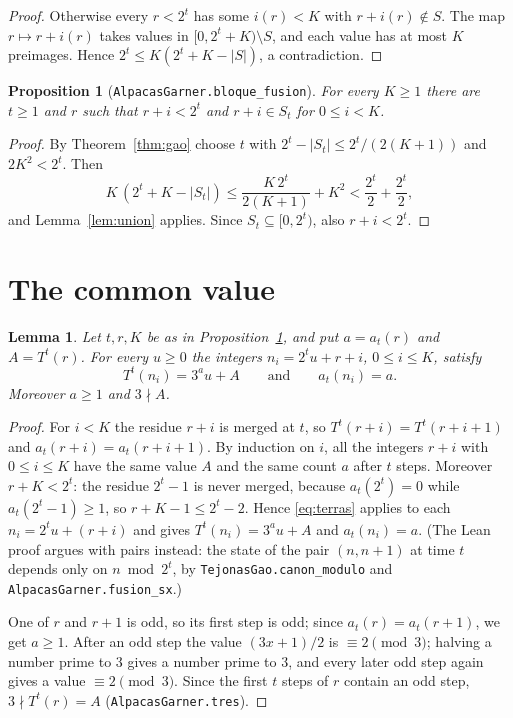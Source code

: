 \documentclass[11pt]{amsart}
\newtheorem{lemma}[theorem]{Lemma}
\newtheorem{proposition}[theorem]{Proposition}
\theoremstyle{definition}
\theoremstyle{remark}
\newcommand{\lean}[1]{\nolinkurl{#1}}
\begin{document}
\begin{proof}
Otherwise every $r<2^t$ has some $i(r)<K$ with $r+i(r)\notin S$. The map $r\mapsto r+i(r)$ takes values in $[0,2^t+K)\setminus S$, and each value has at most $K$ preimages. Hence $2^t\le K(2^t+K-|S|)$, a contradiction.
\end{proof}

\begin{proposition}[\lean{AlpacasGarner.bloque_fusion}]\label{prop:block}
For every $K\ge1$ there are $t\ge1$ and $r$ such that $r+i<2^t$ and $r+i\in S_t$ for $0\le i<K$.
\end{proposition}

\begin{proof}
By Theorem~\ref{thm:gao} choose $t$ with $2^t-|S_t|\le 2^t/(2(K+1))$ and $2K^2<2^t$. Then
\[
K\,(2^t+K-|S_t|)\le \frac{K\,2^t}{2(K+1)}+K^2<\frac{2^t}2+\frac{2^t}2,
\]
and Lemma~\ref{lem:union} applies. Since $S_t\subseteq[0,2^t)$, also $r+i<2^t$.
\end{proof}

\section{The common value}\label{sec:common}

\begin{lemma}\label{lem:common}
Let $t,r,K$ be as in Proposition~\ref{prop:block}, and put $a=a_t(r)$ and $A=T^{t}(r)$. For every $u\ge0$ the integers $n_i=2^tu+r+i$, $0\le i\le K$, satisfy
\[
T^{t}(n_i)=3^au+A\qquad\text{and}\qquad a_t(n_i)=a.
\]
Moreover $a\ge1$ and $3\nmid A$.
\end{lemma}

\begin{proof}
For $i<K$ the residue $r+i$ is merged at $t$, so $T^{t}(r+i)=T^{t}(r+i+1)$ and $a_t(r+i)=a_t(r+i+1)$. By induction on $i$, all the integers $r+i$ with $0\le i\le K$ have the same value $A$ and the same count $a$ after $t$ steps. Moreover $r+K<2^t$: the residue $2^t-1$ is never merged, because $a_t(2^t)=0$ while $a_t(2^t-1)\ge1$, so $r+K-1\le 2^t-2$. Hence \eqref{eq:terras} applies to each $n_i=2^tu+(r+i)$ and gives $T^{t}(n_i)=3^au+A$ and $a_t(n_i)=a$. (The Lean proof argues with pairs instead: the state of the pair $(n,n+1)$ at time $t$ depends only on $n\bmod 2^t$, by \lean{TejonasGao.canon_modulo} and \lean{AlpacasGarner.fusion_sx}.)

One of $r$ and $r+1$ is odd, so its first step is odd; since $a_t(r)=a_t(r+1)$, we get $a\ge1$. After an odd step the value $(3x+1)/2$ is $\equiv 2\pmod 3$; halving a number prime to $3$ gives a number prime to $3$, and every later odd step again gives a value $\equiv2\pmod3$. Since the first $t$ steps of $r$ contain an odd step, $3\nmid T^{t}(r)=A$ (\lean{AlpacasGarner.tres}).
\end{proof}
\end{document}
